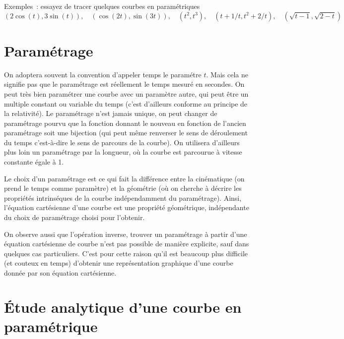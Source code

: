 \documentclass[a4paper,11pt]{book}
\begin{document}
\begin{giacjshere}
Exemples~: essayez de tracer quelques courbes en param\'etriques
$$ (2\cos(t),3\sin(t)), \quad (\cos(2t),\sin(3t)), \quad (t^2,t^3),
\quad (t+1/t, t^2+2/t), \quad (\sqrt{t-1},\sqrt{2-t}) $$

\section{Param\'etrage}
On adoptera souvent la convention d'appeler temps le param\'etre $t$.
Mais cela ne signifie pas que le param\'etrage est r\'eellement le
temps mesur\'e en secondes. On peut tr\`es bien param\'etrer une
courbe avec un param\`etre autre, qui peut \^etre un multiple 
constant ou variable du temps (c'est d'ailleurs conforme au
principe de la relativit\'e). Le param\'etrage n'est jamais unique,
on peut changer de param\'etrage pourvu que la fonction donnant
le nouveau en fonction de l'ancien param\'etrage soit une bijection
(qui peut m\^eme renverser le sens de d\'eroulement du temps
c'est-\`a-dire le sens de parcours de la courbe). On utilisera
d'ailleurs plus loin un param\'etrage par la longueur,
o\`u la courbe est parcourue \`a vitesse constante \'egale \`a 1.

Le choix d'un param\'etrage est ce qui fait la diff\'erence
entre la cin\'ematique (on prend le temps comme param\`etre) et la 
g\'eom\'etrie
(o\`u on cherche \`a d\'ecrire les propri\'et\'es intrins\'eques
de la courbe ind\'ependamment
du param\'etrage). Ainsi, l'\'equation cart\'esienne d'une courbe
est une propri\'et\'e g\'eom\'etrique, ind\'ependante du choix
de param\'etrage choisi pour l'obtenir. 

On observe aussi que l'op\'eration
inverse, trouver un param\'etrage \`a partir d'une \'equation
cart\'esienne de courbe n'est pas possible de mani\`ere
explicite, sauf dans quelques cas particuliers. C'est pour cette
raison qu'il est beaucoup plus difficile (et couteux en temps)
d'obtenir une repr\'esentation graphique d'une courbe donn\'ee
par son \'equation cart\'esienne.

\section{\'Etude analytique d'une courbe en param\'etrique}


\end{giacjshere}
\end{document}
